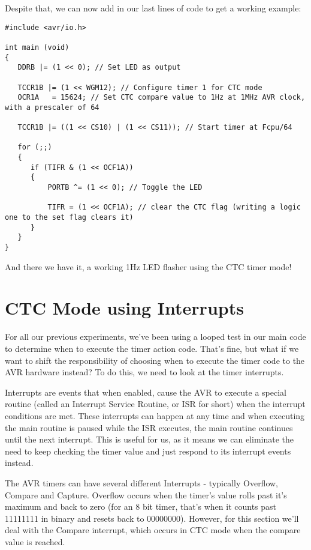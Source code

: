 \documentclass[a4paper,oneside]{book}
\begin{document}
Despite that, we can now add in our last lines of code to get a working example: 

\begin{center}
\begin{lstlisting}
#include <avr/io.h>

int main (void)
{
   DDRB |= (1 << 0); // Set LED as output

   TCCR1B |= (1 << WGM12); // Configure timer 1 for CTC mode
   OCR1A   = 15624; // Set CTC compare value to 1Hz at 1MHz AVR clock, with a prescaler of 64

   TCCR1B |= ((1 << CS10) | (1 << CS11)); // Start timer at Fcpu/64

   for (;;)
   {
      if (TIFR & (1 << OCF1A))
      {
          PORTB ^= (1 << 0); // Toggle the LED

          TIFR = (1 << OCF1A); // clear the CTC flag (writing a logic one to the set flag clears it)
      }
   }
}
\end{lstlisting}
\end{center}

And there we have it, a working 1Hz LED flasher using the CTC timer mode! 


\label{chp:CTCInt}
\chapter{CTC Mode using Interrupts}

For all our previous experiments, we've been using a looped test in our main code to determine when to execute the timer action code. That's fine, but what if we want to shift the responsibility of choosing when to execute the timer code to the AVR hardware instead? To do this, we need to look at the timer interrupts.

Interrupts are events that when enabled, cause the AVR to execute a special routine (called an Interrupt Service Routine, or ISR for short) when the interrupt conditions are met. These interrupts can happen at any time and when executing the main routine is paused while the ISR executes, the main routine continues until the next interrupt. This is useful for us, as it means we can eliminate the need to keep checking the timer value and just respond to its interrupt events instead.

The AVR timers can have several different Interrupts - typically Overflow, Compare and Capture. Overflow occurs when the timer's value rolls past it's maximum and back to zero (for an 8 bit timer, that's when it counts past 11111111 in binary and resets back to 00000000). However, for this section we'll deal with the Compare interrupt, which occurs in CTC mode when the compare value is reached.
\end{document}
